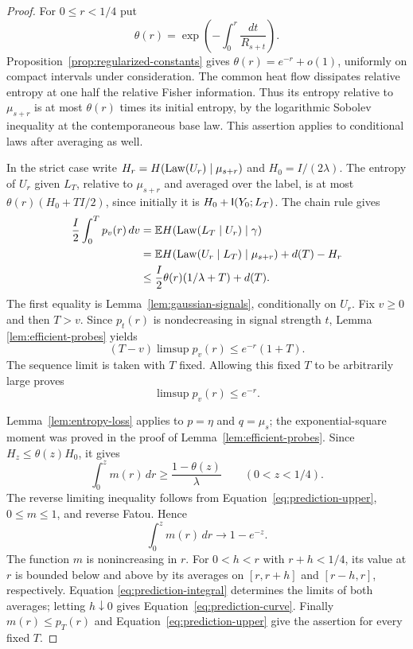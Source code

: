 \begin{proof}
For $0\le r<1/4$ put
\[
 \theta(r)=\exp\left(-\int_0^r\frac{dt}{R_{s+t}}\right).
\]
Proposition~\ref{prop:regularized-constants} gives
$\theta(r)=e^{-r}+o(1)$, uniformly on compact intervals under
consideration.  The common heat flow dissipates relative entropy at
one half the relative Fisher information.  Thus its entropy relative
to $\mu_{s+r}$ is at most $\theta(r)$ times its initial entropy,
by the logarithmic Sobolev inequality at the contemporaneous base law.
This assertion applies to conditional laws after averaging as well.

In the strict case write
$H_r=H(\operatorname{Law}(U_r)\mid\mu_{s+r})$ and
$H_0=I/(2\lambda)$.  The entropy of $U_r$ given $L_T$, relative to
$\mu_{s+r}$ and averaged over the label, is at most
$\theta(r)(H_0+TI/2)$, since initially it is $H_0+\mathsf I(Y_0;L_T)$.
The chain rule gives
\begin{align*}
 \frac I2\int_0^T p_v(r)\,dv
 &=\mathbb E H(\operatorname{Law}(L_T\mid U_r)\mid\gamma)\\
 &=\mathbb E H(\operatorname{Law}(U_r\mid L_T)\mid\mu_{s+r})+d(T)-H_r\\
 &\le\frac I2\theta(r)(1/\lambda+T)+d(T).
\end{align*}
The first equality is Lemma~\ref{lem:gaussian-signals}, conditionally
on $U_r$.  Fix $v\ge0$ and then $T>v$.  Since $p_t(r)$ is
nondecreasing in signal strength $t$, Lemma
\ref{lem:efficient-probes} yields
\[
 (T-v)\limsup p_v(r)\le e^{-r}(1+T).
\]
The sequence limit is taken with $T$ fixed.  Allowing this fixed $T$
to be arbitrarily large proves
\begin{equation}
 \limsup p_v(r)\le e^{-r}.
 \label{eq:prediction-upper}
\end{equation}

Lemma~\ref{lem:entropy-loss} applies to $p=\eta$ and $q=\mu_s$;
the exponential-square moment was proved in the proof of
Lemma~\ref{lem:efficient-probes}.  Since $H_z\le\theta(z)H_0$, it gives
\[
 \int_0^z m(r)\,dr\ge\frac{1-\theta(z)}{\lambda}
 \qquad(0<z<1/4).
\]
The reverse limiting inequality follows from
Equation~\eqref{eq:prediction-upper}, $0\le m\le1$, and reverse
Fatou.  Hence
\begin{equation}
 \int_0^z m(r)\,dr\longrightarrow1-e^{-z}.
 \label{eq:prediction-integral}
\end{equation}
The function $m$ is nonincreasing in $r$.  For $0<h<r$ with
$r+h<1/4$, its value at $r$ is bounded below and above by its
averages on $[r,r+h]$ and $[r-h,r]$, respectively.  Equation
\eqref{eq:prediction-integral} determines the limits of both averages;
letting $h\downarrow0$ gives Equation~\eqref{eq:prediction-curve}.
Finally $m(r)\le p_T(r)$ and Equation~\eqref{eq:prediction-upper}
give the assertion for every fixed $T$.


\end{proof}
